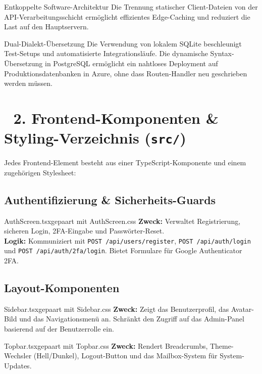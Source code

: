 \documentclass[11pt,a4paper]{article}
\begin{document}
\begin{ImportanceBox}{Entkoppelte Software-Architektur}
Die Trennung statischer Client-Dateien von der API-Verarbeitungsschicht ermöglicht effizientes Edge-Caching und reduziert die Last auf den Hauptservern.
\end{ImportanceBox}

\begin{ReasonBox}{Dual-Dialekt-Übersetzung}
Die Verwendung von lokalem SQLite beschleunigt Test-Setups und automatisierte Integrationsläufe. Die dynamische Syntax-Übersetzung in PostgreSQL ermöglicht ein nahtloses Deployment auf Produktionsdatenbanken in Azure, ohne dass Routen-Handler neu geschrieben werden müssen.
\end{ReasonBox}

\newpage

\section{🎨 2. Frontend-Komponenten \& Styling-Verzeichnis (\texttt{src/})}
Jedes Frontend-Element besteht aus einer TypeScript-Komponente und einem zugehörigen Stylesheet:

\subsection{Authentifizierung \& Sicherheits-Guards}
\begin{FeatureCard}{AuthScreen.tsx}{gepaart mit AuthScreen.css}
\textbf{Zweck:} Verwaltet Registrierung, sicheren Login, 2FA-Eingabe und Passwörter-Reset. \\
\textbf{Logik:} Kommuniziert mit \texttt{POST /api/users/register}, \texttt{POST /api/auth/login} und \texttt{POST /api/auth/2fa/login}. Bietet Formulare für Google Authenticator 2FA.
\end{FeatureCard}

\subsection{Layout-Komponenten}
\begin{FeatureCard}{Sidebar.tsx}{gepaart mit Sidebar.css}
\textbf{Zweck:} Zeigt das Benutzerprofil, das Avatar-Bild und das Navigationsmenü an. Schränkt den Zugriff auf das Admin-Panel basierend auf der Benutzerrolle ein.
\end{FeatureCard}

\begin{FeatureCard}{Topbar.tsx}{gepaart mit Topbar.css}
\textbf{Zweck:} Rendert Breadcrumbs, Theme-Wechsler (Hell/Dunkel), Logout-Button und das Mailbox-System für System-Updates.
\end{FeatureCard}
\end{document}
